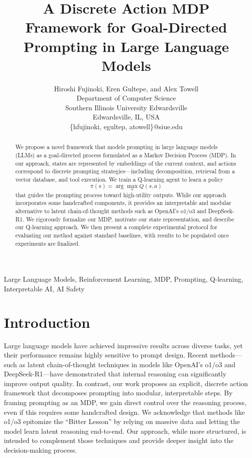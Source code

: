 \documentclass[10pt,journal,compsoc]{IEEEtran}
\begin{document}
\title{A Discrete Action MDP Framework for Goal-Directed Prompting in
Large Language Models}

\author{
  Hiroshi Fujinoki, Eren Gultepe, and Alex Towell\\
  Department of Computer Science\\
  Southern Illinois University Edwardsville\\
  Edwardsville, IL, USA\\
  \{hfujinoki, egultep, atowell\}@siue.edu
}
\maketitle

\begin{abstract}
  We propose a novel framework that models prompting in large language
  models (LLMs) as a goal-directed process formulated as a Markov Decision
  Process (MDP). In our approach, states are represented by embeddings of
  the current context, and actions correspond to discrete prompting
  strategies---including decomposition, retrieval from a vector database,
  and tool execution. We train a Q-learning agent to learn a policy
  $$
  \pi(s) = \arg\max_a Q(s,a)
  $$
  that guides the prompting process toward
  high-utility outputs. While our approach incorporates some handcrafted
  components, it provides an interpretable and modular alternative to
  latent chain-of-thought methods such as OpenAI's o1/o3 and DeepSeek-R1.
  We rigorously formalize our MDP, motivate our state representation, and
  describe our Q-learning approach. We then present a complete
  experimental protocol for evaluating our method against standard
  baselines, with results to be populated once experiments are finalized.
\end{abstract}

\begin{IEEEkeywords}
  Large Language Models, Reinforcement Learning, MDP,
  Prompting, Q-learning, Interpretable AI, AI Safety
\end{IEEEkeywords}
  

\section{Introduction}

Large language models have achieved impressive results across diverse
tasks, yet their performance remains highly sensitive to prompt design.
Recent methods---such as latent chain-of-thought techniques in models
like OpenAI's o1/o3 and DeepSeek-R1---have demonstrated that internal
reasoning can significantly improve output quality. In contrast, our
work proposes an explicit, discrete action framework that decomposes
prompting into modular, interpretable steps. By framing prompting as an
MDP, we gain direct control over the reasoning process, even if this
requires some handcrafted design. We acknowledge that methods like o1/o3
epitomize the ``Bitter Lesson'' by relying on massive data and letting
the model learn latent reasoning end-to-end. Our approach, while more
structured, is intended to complement those techniques and provide
deeper insight into the decision-making process.
\end{document}
